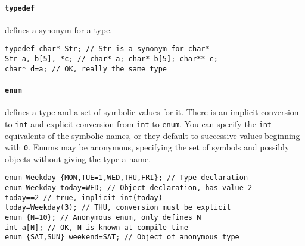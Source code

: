 		\paragraph{\lstinline!typedef!} %
			
			defines a synonym for a type.
			\begin{code}\begin{lstlisting}[style=list]
typedef char* Str; // Str is a synonym for char*
Str a, b[5], *c; // char* a; char* b[5]; char** c;
char* d=a; // OK, really the same type
			\end{lstlisting}\end{code}
			
		
		\paragraph{\lstinline!enum!} %
			defines a type and a set of symbolic values for it. There is an implicit conversion to \lstinline!int! and explicit conversion from \lstinline!int! to \lstinline!enum!. You can specify the \lstinline!int! equivalents of the symbolic names, or they default to successive values beginning with \lstinline!0!. Enums may be anonymous, specifying the set of symbols and possibly objects without giving the type a name.
			\begin{code}\begin{lstlisting}[style=list]
enum Weekday {MON,TUE=1,WED,THU,FRI}; // Type declaration
enum Weekday today=WED; // Object declaration, has value 2
today==2 // true, implicit int(today)
today=Weekday(3); // THU, conversion must be explicit
enum {N=10}; // Anonymous enum, only defines N
int a[N]; // OK, N is known at compile time
enum {SAT,SUN} weekend=SAT; // Object of anonymous type
			\end{lstlisting}\end{code}
	
